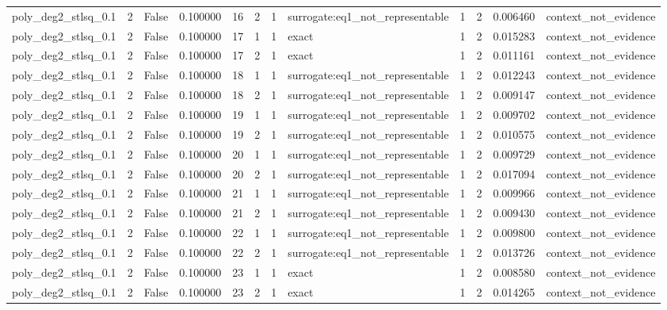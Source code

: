 \begin{tabular}{lrrrrrrlrrrl}
poly\_deg2\_stlsq\_0.1 & 2 & False & 0.100000 & 16 & 2 & 1 & surrogate:eq1\_not\_representable & 1 & 2 & 0.006460 & context\_not\_evidence \\
poly\_deg2\_stlsq\_0.1 & 2 & False & 0.100000 & 17 & 1 & 1 & exact & 1 & 2 & 0.015283 & context\_not\_evidence \\
poly\_deg2\_stlsq\_0.1 & 2 & False & 0.100000 & 17 & 2 & 1 & exact & 1 & 2 & 0.011161 & context\_not\_evidence \\
poly\_deg2\_stlsq\_0.1 & 2 & False & 0.100000 & 18 & 1 & 1 & surrogate:eq1\_not\_representable & 1 & 2 & 0.012243 & context\_not\_evidence \\
poly\_deg2\_stlsq\_0.1 & 2 & False & 0.100000 & 18 & 2 & 1 & surrogate:eq1\_not\_representable & 1 & 2 & 0.009147 & context\_not\_evidence \\
poly\_deg2\_stlsq\_0.1 & 2 & False & 0.100000 & 19 & 1 & 1 & surrogate:eq1\_not\_representable & 1 & 2 & 0.009702 & context\_not\_evidence \\
poly\_deg2\_stlsq\_0.1 & 2 & False & 0.100000 & 19 & 2 & 1 & surrogate:eq1\_not\_representable & 1 & 2 & 0.010575 & context\_not\_evidence \\
poly\_deg2\_stlsq\_0.1 & 2 & False & 0.100000 & 20 & 1 & 1 & surrogate:eq1\_not\_representable & 1 & 2 & 0.009729 & context\_not\_evidence \\
poly\_deg2\_stlsq\_0.1 & 2 & False & 0.100000 & 20 & 2 & 1 & surrogate:eq1\_not\_representable & 1 & 2 & 0.017094 & context\_not\_evidence \\
poly\_deg2\_stlsq\_0.1 & 2 & False & 0.100000 & 21 & 1 & 1 & surrogate:eq1\_not\_representable & 1 & 2 & 0.009966 & context\_not\_evidence \\
poly\_deg2\_stlsq\_0.1 & 2 & False & 0.100000 & 21 & 2 & 1 & surrogate:eq1\_not\_representable & 1 & 2 & 0.009430 & context\_not\_evidence \\
poly\_deg2\_stlsq\_0.1 & 2 & False & 0.100000 & 22 & 1 & 1 & surrogate:eq1\_not\_representable & 1 & 2 & 0.009800 & context\_not\_evidence \\
poly\_deg2\_stlsq\_0.1 & 2 & False & 0.100000 & 22 & 2 & 1 & surrogate:eq1\_not\_representable & 1 & 2 & 0.013726 & context\_not\_evidence \\
poly\_deg2\_stlsq\_0.1 & 2 & False & 0.100000 & 23 & 1 & 1 & exact & 1 & 2 & 0.008580 & context\_not\_evidence \\
poly\_deg2\_stlsq\_0.1 & 2 & False & 0.100000 & 23 & 2 & 1 & exact & 1 & 2 & 0.014265 & context\_not\_evidence \\

\end{tabular}
